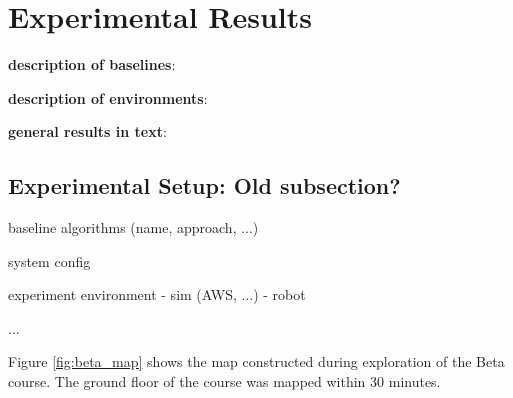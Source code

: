 \documentclass{article}
\newcommand{\ph}[1]{{\textbf{#1}:}} %
\begin{document}
\fi %




\section{Experimental Results}

\ph{description of baselines}

\ph{description of environments}

\ph{general results in text}





\subsection{Experimental Setup: Old subsection?}

baseline algorithms (name, approach, ...)

system config

experiment environment
- sim (AWS, ...)
- robot

...




Figure \ref{fig:beta_map} shows the map constructed during exploration of the Beta course. The ground floor of the course was mapped within 30 minutes.  
\end{document}
